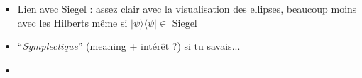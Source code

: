 \begin{itemize}
	\item Lien avec Siegel : assez clair avec la visualisation des ellipses, beaucoup moins avec les Hilberts même si $| \psi\rangle \langle \psi |\in$ Siegel \apriori
	
	\item ``\textit{Symplectique}'' (meaning + intérêt ?) si tu savais...	
	
	\item 
\end{itemize}




\newpage

\listoffigures
\vfill
\lstlistoflistings
\vfill

\newpage

{}

